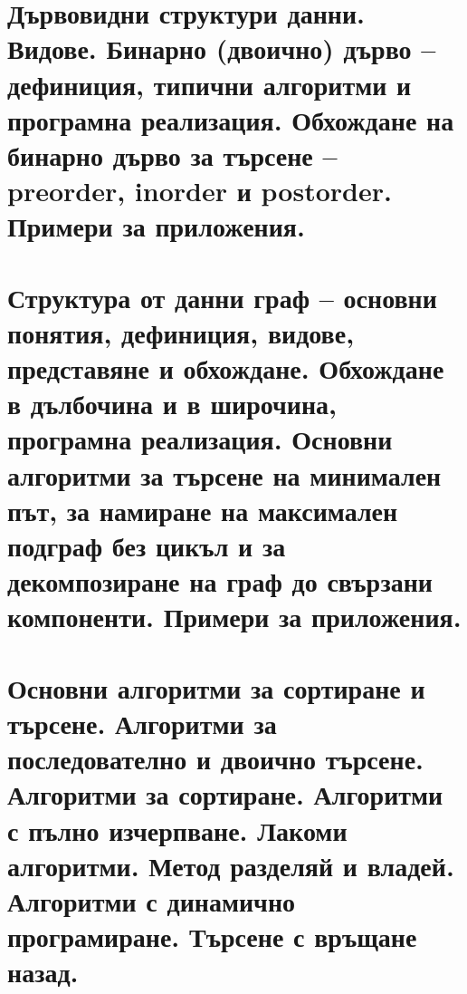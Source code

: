 \chapter{Дървовидни структури данни. Видове. Бинарно (двоично) дърво -- дефиниция, типични алгоритми и програмна реализация. Обхождане на бинарно дърво за търсене -- preorder, inorder и postorder. Примери за приложения.}

\chapter{Структура от данни граф – основни понятия, дефиниция, видове, представяне и обхождане. Обхождане в дълбочина и в широчина, програмна реализация. Основни алгоритми за търсене на минимален път, за намиране на максимален подграф без цикъл и за декомпозиране на граф до свързани компоненти. Примери за приложения.}

\chapter{Основни алгоритми за сортиране и търсене. Алгоритми за последователно и двоично търсене. Алгоритми за сортиране. Алгоритми с пълно изчерпване. Лакоми алгоритми. Метод разделяй и владей. Алгоритми с динамично програмиране. Търсене с връщане назад.}

